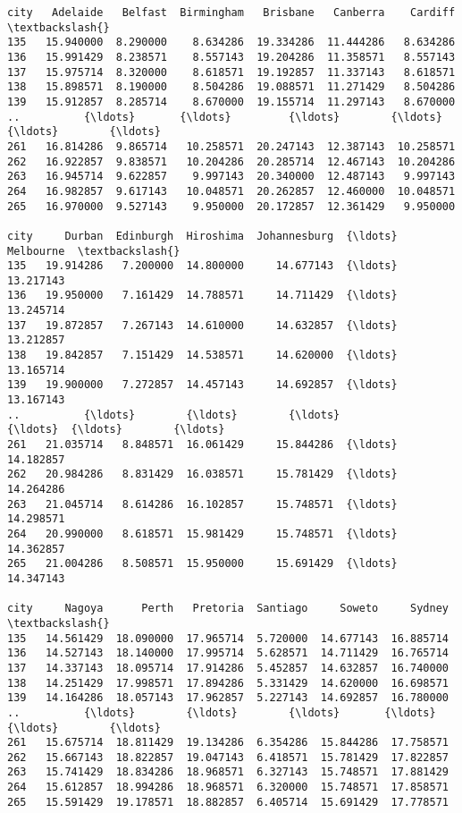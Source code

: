 \documentclass[11pt]{article}
\makeatletter
\newcommand{\boxspacing}{\kern\kvtcb@left@rule\kern\kvtcb@boxsep}
\newcommand{\prompt}[4]{
        {\ttfamily\llap{{\color{#2}[#3]:\hspace{3pt}#4}}\vspace{-\baselineskip}}
    }
\makeatother
\begin{document}
            \begin{tcolorbox}[breakable, size=fbox, boxrule=.5pt, pad at break*=1mm, opacityfill=0]
\prompt{Out}{outcolor}{131}{\boxspacing}
\begin{Verbatim}[commandchars=\\\{\}]
city   Adelaide   Belfast  Birmingham   Brisbane   Canberra    Cardiff  \textbackslash{}
135   15.940000  8.290000    8.634286  19.334286  11.444286   8.634286
136   15.991429  8.238571    8.557143  19.204286  11.358571   8.557143
137   15.975714  8.320000    8.618571  19.192857  11.337143   8.618571
138   15.898571  8.190000    8.504286  19.088571  11.271429   8.504286
139   15.912857  8.285714    8.670000  19.155714  11.297143   8.670000
..          {\ldots}       {\ldots}         {\ldots}        {\ldots}        {\ldots}        {\ldots}
261   16.814286  9.865714   10.258571  20.247143  12.387143  10.258571
262   16.922857  9.838571   10.204286  20.285714  12.467143  10.204286
263   16.945714  9.622857    9.997143  20.340000  12.487143   9.997143
264   16.982857  9.617143   10.048571  20.262857  12.460000  10.048571
265   16.970000  9.527143    9.950000  20.172857  12.361429   9.950000

city     Durban  Edinburgh  Hiroshima  Johannesburg  {\ldots}  Melbourne  \textbackslash{}
135   19.914286   7.200000  14.800000     14.677143  {\ldots}  13.217143
136   19.950000   7.161429  14.788571     14.711429  {\ldots}  13.245714
137   19.872857   7.267143  14.610000     14.632857  {\ldots}  13.212857
138   19.842857   7.151429  14.538571     14.620000  {\ldots}  13.165714
139   19.900000   7.272857  14.457143     14.692857  {\ldots}  13.167143
..          {\ldots}        {\ldots}        {\ldots}           {\ldots}  {\ldots}        {\ldots}
261   21.035714   8.848571  16.061429     15.844286  {\ldots}  14.182857
262   20.984286   8.831429  16.038571     15.781429  {\ldots}  14.264286
263   21.045714   8.614286  16.102857     15.748571  {\ldots}  14.298571
264   20.990000   8.618571  15.981429     15.748571  {\ldots}  14.362857
265   21.004286   8.508571  15.950000     15.691429  {\ldots}  14.347143

city     Nagoya      Perth   Pretoria  Santiago     Soweto     Sydney  \textbackslash{}
135   14.561429  18.090000  17.965714  5.720000  14.677143  16.885714
136   14.527143  18.140000  17.995714  5.628571  14.711429  16.765714
137   14.337143  18.095714  17.914286  5.452857  14.632857  16.740000
138   14.251429  17.998571  17.894286  5.331429  14.620000  16.698571
139   14.164286  18.057143  17.962857  5.227143  14.692857  16.780000
..          {\ldots}        {\ldots}        {\ldots}       {\ldots}        {\ldots}        {\ldots}
261   15.675714  18.811429  19.134286  6.354286  15.844286  17.758571
262   15.667143  18.822857  19.047143  6.418571  15.781429  17.822857
263   15.741429  18.834286  18.968571  6.327143  15.748571  17.881429
264   15.612857  18.994286  18.968571  6.320000  15.748571  17.858571
265   15.591429  19.178571  18.882857  6.405714  15.691429  17.778571


\end{Verbatim}
\end{tcolorbox}
\end{document}
